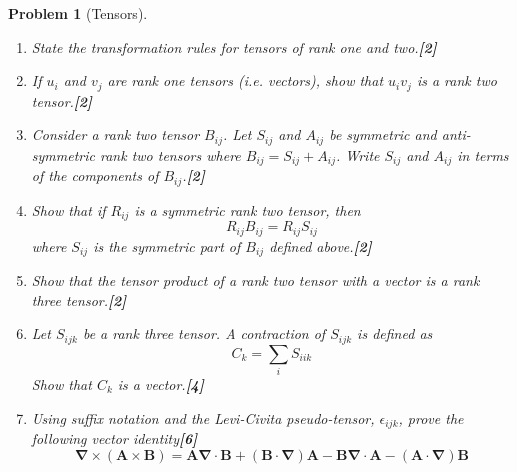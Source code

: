 \documentclass[a4paper]{article}
\theoremstyle{new}
\newtheorem{qns}{Problem}[section]
\begin{document}
\begin{qns}[Tensors]\leavevmode
\begin{enumerate}[label=(\roman*)]
\item State the transformation rules for tensors of rank one and two.\hfill\textbf{[2]}
\item If $u_i$ and $v_j$ are rank one tensors (i.e. vectors), show that $u_iv_j$ is a rank two tensor.\hfill\textbf{[2]}
\item Consider a rank two tensor $B_{ij}$. Let $S_{ij}$ and $A_{ij}$ be symmetric and anti-symmetric rank two tensors where $B_{ij} = S_{ij}+A_{ij}$. Write $S_{ij}$ and $A_{ij}$ in terms of the components of $B_{ij}$.\hfill\textbf{[2]}
\item Show that if $R_{ij}$ is a symmetric rank two tensor, then 
$$R_{ij}B_{ij}=R_{ij}S_{ij}$$
where $S_{ij}$ is the symmetric part of $B_{ij}$ defined above.\hfill\textbf{[2]}
\item Show that the tensor product of a rank two tensor with a vector is a rank three
tensor.\hfill\textbf{[2]}
\item Let $S_{ijk}$ be a rank three tensor. A contraction of $S_{ijk}$ is defined as
$$C_k=\sum_i S_{iik}$$
Show that $C_k$ is a vector.\hfill\textbf{[4]}
\item Using suffix notation and the Levi-Civita pseudo-tensor, $\epsilon_{ijk}$, prove the following vector identity\hfill\textbf{[6]}
$$\boldsymbol{\nabla}\times(\mathbf{A}\times\mathbf{B})=\mathbf{A}\boldsymbol{\nabla}\cdot\mathbf{B}+(\mathbf{B}\cdot\boldsymbol{\nabla})\mathbf{A}-\mathbf{B}\boldsymbol{\nabla}\cdot\mathbf{A}-(\mathbf{A}\cdot\boldsymbol{\nabla})\mathbf{B}$$
\end{enumerate}
\end{qns}
\end{document}
